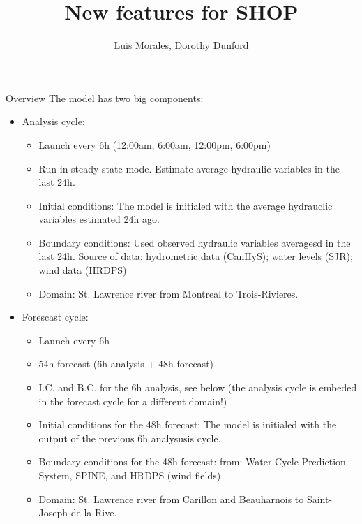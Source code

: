 \documentclass{beamer}
\title{New features for SHOP}
\subtitle{Luis Morales, Dorothy Dunford}
\begin{document}
	\frame {
		\titlepage
	}
\begin{frame}[allowframebreaks]{Overview}
The model has two big components:
\begin{itemize}
\item Analysis cycle:

\begin{itemize}
\item Launch every 6h (12:00am, 6:00am, 12:00pm, 6:00pm)
\item Run in steady-state mode. Estimate average hydraulic variables in the last 24h.
\item Initial conditions: The model is initialed with the average hydrauclic variables estimated 24h ago.
\item Boundary conditions: Used observed hydraulic variables averagesd in the last 24h. Source of data: hydrometric data (CanHyS); water levels (SJR); wind data (HRDPS)
\item Domain: St. Lawrence river from Montreal to Trois-Rivieres.
\end{itemize}

\framebreak
\item Forescast cycle:

\begin{itemize}
\item Launch every 6h
\item 54h forecast (6h analysis + 48h forecast) 
\item I.C. and B.C. for the 6h analysis, see below (the analysis cycle is embeded in the forecast cycle for a different domain!)
\item Initial conditions for the 48h forecast: The model is initialed with the output of the previous 6h analysusis cycle.
\item Boundary conditions for the 48h forecast: from: Water Cycle Prediction System, SPINE, and HRDPS (wind fields)
\item Domain: St. Lawrence river from Carillon and Beauharnois to Saint-Joseph-de-la-Rive.
\end{itemize}
\end{itemize}
\end{frame}
\end{document}

